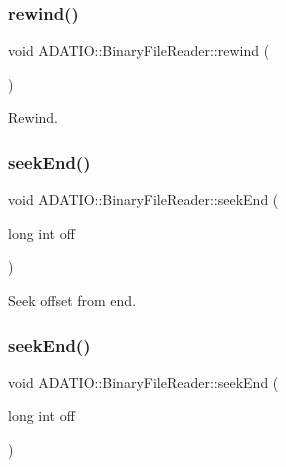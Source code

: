 \subsubsection{\texorpdfstring{rewind()}{rewind()}\hspace{0.1cm}{\footnotesize\ttfamily [3/3]}}
{\footnotesize\ttfamily void A\+D\+A\+T\+I\+O\+::\+Binary\+File\+Reader\+::rewind (\begin{DoxyParamCaption}{ }\end{DoxyParamCaption})}



Rewind. 

\mbox{\label{classADATIO_1_1BinaryFileReader_a1ae70d2eb56f1c1b1769ce9557f8ebbf}} 
\subsubsection{\texorpdfstring{seekEnd()}{seekEnd()}\hspace{0.1cm}{\footnotesize\ttfamily [1/3]}}
{\footnotesize\ttfamily void A\+D\+A\+T\+I\+O\+::\+Binary\+File\+Reader\+::seek\+End (\begin{DoxyParamCaption}\item[{long int}]{off }\end{DoxyParamCaption})}



Seek offset from end. 

\mbox{\label{classADATIO_1_1BinaryFileReader_a1ae70d2eb56f1c1b1769ce9557f8ebbf}} 
\subsubsection{\texorpdfstring{seekEnd()}{seekEnd()}\hspace{0.1cm}{\footnotesize\ttfamily [2/3]}}
{\footnotesize\ttfamily void A\+D\+A\+T\+I\+O\+::\+Binary\+File\+Reader\+::seek\+End (\begin{DoxyParamCaption}\item[{long int}]{off }\end{DoxyParamCaption})}



